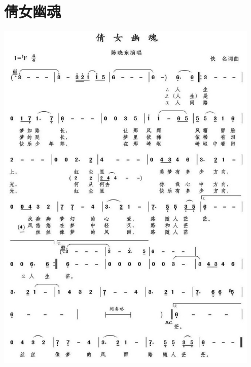 \documentclass[cn,pad,twocol]{elegantbook}
\begin{document}
\section{倩女幽魂}\includegraphics[width=0.95\textwidth]{dongxiao/20200819/倩女幽魂.jpeg}
\end{document}
